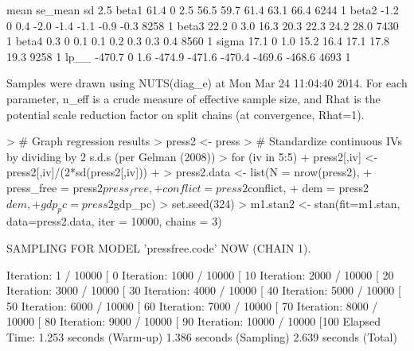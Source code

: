 \documentclass[12pt]{article}
\begin{document}
\begin{enumerate}
\begin{Schunk}
\begin{Soutput}
        mean se_mean  sd   2.5%
beta1   61.4       0 2.5   56.5   59.7   61.4   63.1   66.4  6244    1
beta2   -1.2       0 0.4   -2.0   -1.4   -1.1   -0.9   -0.3  8258    1
beta3   22.2       0 3.0   16.3   20.3   22.3   24.2   28.0  7430    1
beta4    0.3       0 0.1    0.1    0.2    0.3    0.3    0.4  8560    1
sigma   17.1       0 1.0   15.2   16.4   17.1   17.8   19.3  9258    1
lp__  -470.7       0 1.6 -474.9 -471.6 -470.4 -469.6 -468.6  4693    1

Samples were drawn using NUTS(diag_e) at Mon Mar 24 11:04:40 2014.
For each parameter, n_eff is a crude measure of effective sample size,
and Rhat is the potential scale reduction factor on split chains (at 
convergence, Rhat=1).
\end{Soutput}
\end{Schunk}

\begin{Schunk}
\begin{Sinput}
> # Graph regression results
> press2 <- press
> # Standardize continuous IVs by dividing by 2 s.d.s (per Gelman (2008))
> for (iv in 5:5) {
+     press2[,iv] <- press2[,iv]/(2*sd(press2[,iv]))
+ }
> press2.data <- list(N = nrow(press2), 
+                     press_free = press2$press_free, 
+                     conflict = press2$conflict,
+                     dem = press2$dem, 
+                     gdp_pc = press2$gdp_pc)
> set.seed(324)
> m1.stan2 <- stan(fit=m1.stan, data=press2.data, iter = 10000, chains = 3)
\end{Sinput}
\begin{Soutput}
SAMPLING FOR MODEL 'pressfree.code' NOW (CHAIN 1).

Iteration:    1 / 10000 [  0%
Iteration: 1000 / 10000 [ 10%
Iteration: 2000 / 10000 [ 20%
Iteration: 3000 / 10000 [ 30%
Iteration: 4000 / 10000 [ 40%
Iteration: 5000 / 10000 [ 50%
Iteration: 6000 / 10000 [ 60%
Iteration: 7000 / 10000 [ 70%
Iteration: 8000 / 10000 [ 80%
Iteration: 9000 / 10000 [ 90%
Iteration: 10000 / 10000 [100%
Elapsed Time: 1.253 seconds (Warm-up)
              1.386 seconds (Sampling)
              2.639 seconds (Total)


\end{Soutput}
\end{Schunk}
\end{enumerate}
\end{document}
